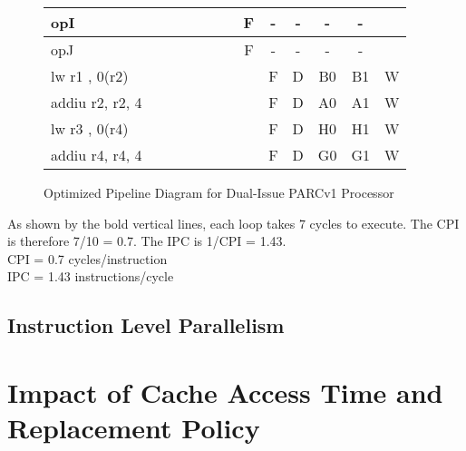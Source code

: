\documentclass[10pt]{article}
\begin{document}
\begin{figure}[H]
{\begin{tabular}{|l|c|c|c|c!{\vrule width 1.5pt}c|c|c|c|c|c|c!{\vrule width 1.5pt}c|}
opI               &    &    &    &    &    &    & F  & -  & -  & -  & -  &    \\ \hline
opJ               &    &    &    &    &    &    & F  & -  & -  & -  & -  &    \\ \hline
lw r1 , 0(r2)     &    &    &    &    &    &    &    & F  & D  & B0 & B1 & W  \\ \hline
addiu r2, r2, 4   &    &    &    &    &    &    &    & F  & D  & A0 & A1 & W  \\ \hline
lw r3 , 0(r4)     &    &    &    &    &    &    &    & F  & D  & H0 & H1 & W  \\ \hline
addiu r4, r4, 4   &    &    &    &    &    &    &    & F  & D  & G0 & G1 & W  \\ \hline
\end{tabular}
}
\caption{Optimized Pipeline Diagram for Dual-Issue PARCv1 Processor}
\end{figure}

As shown by the bold vertical lines, each loop takes 7 cycles to execute. The CPI is therefore 7/10 = 0.7. The IPC is 1/CPI = 1.43.\\
CPI = 0.7 cycles/instruction\\
IPC = 1.43 instructions/cycle\\

\subsection{Instruction Level Parallelism}

\cleardoublepage
\section{Impact of Cache Access Time and Replacement Policy}
\end{document}
